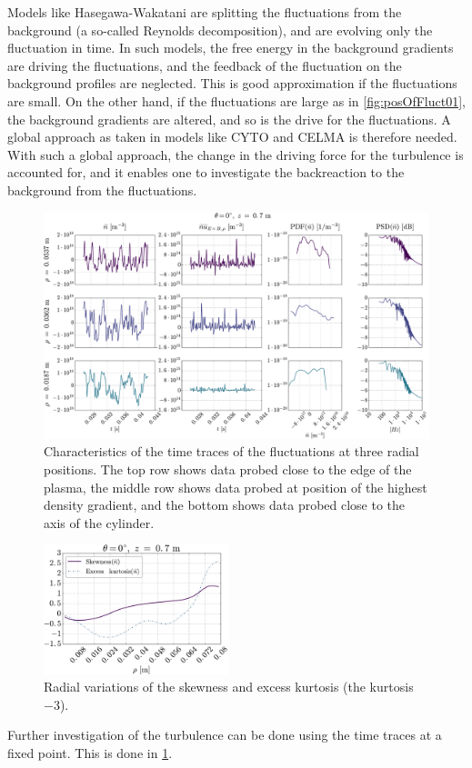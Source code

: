 Models like Hasegawa-Wakatani \cite{Hasegawa1987,Holland2007} are splitting the fluctuations from the background (a so-called Reynolds decomposition), and are evolving only the fluctuation in time.
In such models, the free energy in the background gradients are driving the fluctuations, and the feedback of the fluctuation on the background profiles are neglected.
This is good approximation if the fluctuations are small.
On the other hand, if the fluctuations are large as in \cref{fig:posOfFluct01}, the background gradients are altered, and so is the drive for the fluctuations.
A global approach as taken in models like CYTO \cite{Naulin2008,Windisch2011a,Windisch2011b} and CELMA is therefore needed.
With such a global approach, the change in the driving force for the turbulence is accounted for, and it enables one to investigate the backreaction to the background from the fluctuations.


%
\begin{figure}[htb]
    \centering
    \includegraphics[width=1.0\textwidth]{fig/results/combinedPlots/008T}
    \caption{Characteristics of the time traces of the fluctuations at three radial positions.
        The top row shows data probed close to the edge of the plasma,
        the middle row shows data probed at position of the highest density gradient,
        and the bottom shows data probed close to the axis of the cylinder.
    }
    \label{fig:combinedPlots008}
\end{figure}
%
%
\begin{figure}
    \begin{center}
        \includegraphics[width=0.48\textwidth]{fig/results/skewKurt/008T}
    \end{center}
    \caption{Radial variations of the skewness and excess kurtosis (the kurtosis $-3$).}
    \label{fig:skewKurt008}
\end{figure}
%
Further investigation of the turbulence can be done using the time traces at a fixed point.
This is done in \cref{fig:combinedPlots008}.

